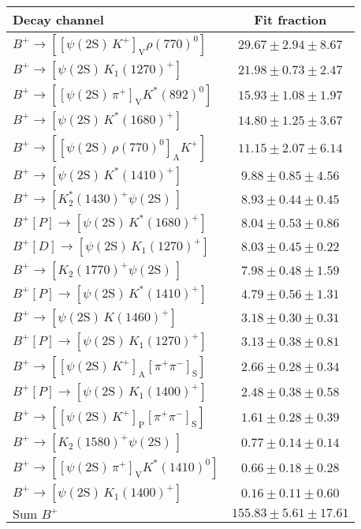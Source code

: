 \begin{tabular}{l c} 
\hline
\hline
Decay channel &  Fit fraction  \\ 
\hline
$B^{+}\rightarrow \left[\left[\psi(\text{2S})\,K^{+}\right]_{\text{V}}\rho(770)^{0}\right]$ & $29.67 \pm 2.94 \pm 8.67$ \\ 
$B^{+}\rightarrow \left[\psi(\text{2S})\,K_{1}(1270)^{+}\right]$ & $21.98 \pm 0.73 \pm 2.47$ \\ 
$B^{+}\rightarrow \left[\left[\psi(\text{2S})\,\pi^{+}\right]_{\text{V}}K^{*}(892)^{0}\right]$ & $15.93 \pm 1.08 \pm 1.97$ \\ 
$B^{+}\rightarrow \left[\psi(\text{2S})\,K^{*}(1680)^{+}\right]$ & $14.80 \pm 1.25 \pm 3.67$ \\ 
$B^{+}\rightarrow \left[\left[\psi(\text{2S})\,\rho(770)^{0}\right]_{\text{A}}K^{+}\right]$ & $11.15 \pm 2.07 \pm 6.14$ \\ 
$B^{+}\rightarrow \left[\psi(\text{2S})\,K^{*}(1410)^{+}\right]$ & $9.88 \pm 0.85 \pm 4.56$ \\ 
$B^{+}\rightarrow \left[K_{2}^{*}(1430)^{+}\psi(\text{2S})\,\right]$ & $8.93 \pm 0.44 \pm 0.45$ \\ 
$B^{+}\left[P\right]\rightarrow \left[\psi(\text{2S})\,K^{*}(1680)^{+}\right]$ & $8.04 \pm 0.53 \pm 0.86$ \\ 
$B^{+}\left[D\right]\rightarrow \left[\psi(\text{2S})\,K_{1}(1270)^{+}\right]$ & $8.03 \pm 0.45 \pm 0.22$ \\ 
$B^{+}\rightarrow \left[K_{2}(1770)^{+}\psi(\text{2S})\,\right]$ & $7.98 \pm 0.48 \pm 1.59$ \\ 
$B^{+}\left[P\right]\rightarrow \left[\psi(\text{2S})\,K^{*}(1410)^{+}\right]$ & $4.79 \pm 0.56 \pm 1.31$ \\ 
$B^{+}\rightarrow \left[\psi(\text{2S})\,K(1460)^{+}\right]$ & $3.18 \pm 0.30 \pm 0.31$ \\ 
$B^{+}\left[P\right]\rightarrow \left[\psi(\text{2S})\,K_{1}(1270)^{+}\right]$ & $3.13 \pm 0.38 \pm 0.81$ \\ 
$B^{+}\rightarrow \left[\left[\psi(\text{2S})\,K^{+}\right]_{\text{A}}\left[\pi^{+}\pi^{-}\right]_{\text{S}}\right]$ & $2.66 \pm 0.28 \pm 0.34$ \\ 
$B^{+}\left[P\right]\rightarrow \left[\psi(\text{2S})\,K_{1}(1400)^{+}\right]$ & $2.48 \pm 0.38 \pm 0.58$ \\ 
$B^{+}\rightarrow \left[\left[\psi(\text{2S})\,K^{+}\right]_{\text{P}}\left[\pi^{+}\pi^{-}\right]_{\text{S}}\right]$ & $1.61 \pm 0.28 \pm 0.39$ \\ 
$B^{+}\rightarrow \left[K_{2}(1580)^{+}\psi(\text{2S})\,\right]$ & $0.77 \pm 0.14 \pm 0.14$ \\ 
$B^{+}\rightarrow \left[\left[\psi(\text{2S})\,\pi^{+}\right]_{\text{V}}K^{*}(1410)^{0}\right]$ & $0.66 \pm 0.18 \pm 0.28$ \\ 
$B^{+}\rightarrow \left[\psi(\text{2S})\,K_{1}(1400)^{+}\right]$ & $0.16 \pm 0.11 \pm 0.60$ \\ 
$\text{Sum } B^{+}$ & $155.83 \pm 5.61 \pm 17.61$ \\ 
\hline
\hline
\end{tabular}
